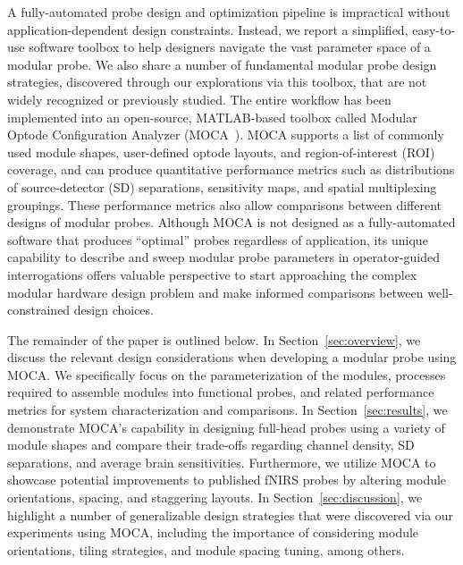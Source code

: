 A fully-automated probe design and optimization pipeline is impractical without application-dependent design constraints. Instead, we report a simplified, easy-to-use software toolbox to help designers navigate the vast parameter space of a modular probe. We also share a number of fundamental modular probe design strategies, discovered through our explorations via this toolbox, that are not widely recognized or previously studied. The entire workflow has been implemented into an open-source, MATLAB-based toolbox called Modular Optode Configuration Analyzer (MOCA~\cite{Vanegas2020}). MOCA supports a list of commonly used module shapes, user-defined optode layouts, and region-of-interest (ROI) coverage, and can produce quantitative performance metrics such as distributions of source-detector (SD) separations, sensitivity maps, and spatial multiplexing groupings. These performance metrics also allow comparisons between different designs of modular probes. Although MOCA is not designed as a fully-automated software that produces ``optimal'' probes regardless of application, its unique capability to describe and sweep modular probe parameters in operator-guided interrogations offers valuable perspective to start approaching the complex modular hardware design problem and make informed comparisons between well-constrained design choices.

The remainder of the paper is outlined below. In Section~\ref{sec:overview}, we discuss the relevant design considerations when developing a modular probe using MOCA. We specifically focus on the parameterization of the modules, processes required to assemble modules into functional probes, and related performance metrics for system characterization and comparisons. In Section~\ref{sec:results}, we demonstrate MOCA's capability in designing full-head probes using a variety of module shapes and compare their trade-offs regarding channel density, SD separations, and average brain sensitivities. Furthermore, we utilize MOCA to showcase potential improvements to published fNIRS probes by altering module orientations, spacing, and staggering layouts. In Section~\ref{sec:discussion}, we highlight a number of generalizable design strategies that were discovered via our experiments using MOCA, including the importance of considering module orientations, tiling strategies, and module spacing tuning, among others.

